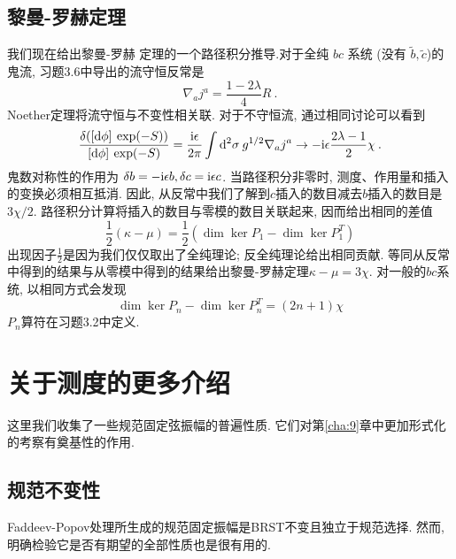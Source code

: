\subsection*{黎曼-罗赫定理}
我们现在给出黎曼-罗赫 定理的一个路径积分推导.对于全纯 $b c$ 系统 (没有 $\tilde{b}, \tilde{c}$)的鬼流, 习题3.6中导出的流守恒反常是
\begin{equation}
	\nabla_{a} j^{a}=\frac{1-2 \lambda}{4} R \:. \label{5.3.19}
\end{equation}
Noether定理将流守恒与不变性相关联. 对于不守恒流, 通过相同讨论可以看到
\begin{equation}
	\frac{\delta([\mathrm{d} \phi]\: \exp (-S))}{[\mathrm{d} \phi] \:\exp (-S)}=\frac{\mathrm{i} \epsilon}{2 \pi} \int \mathrm{d}^{2} \sigma \: g^{1 / 2} \nabla_{a} j^{a} \rightarrow-\mathrm{i} \epsilon \frac{2 \lambda-1}{2} \chi \:. \label{5.3.20}
\end{equation}
鬼数对称性的作用为 $\delta b=-\mathrm{i} \epsilon b, \delta c=\mathrm{i} \epsilon c $.  当路径积分非零时, 测度、作用量和插入的变换必须相互抵消. 
因此, 从反常中我们了解到$c$插入的数目减去$b$插入的数目是$3 \chi / 2 $.  路径积分计算将插入的数目与零模的数目关联起来, 因而给出相同的差值
\begin{equation}
	\frac{1}{2}(\kappa-\mu)=\frac{1}{2}(\operatorname{dim} \operatorname{ker} P_{1}-\operatorname{dim} \operatorname{ker} P_{1}^{T}) 
	\label{5.3.21}
\end{equation}
出现因子$\frac{1}{2}$是因为我们仅仅取出了全纯理论; 反全纯理论给出相同贡献. 等同从反常中得到的结果与从零模中得到的结果给出黎曼-罗赫定理$\kappa-\mu=3 \chi$. 
对一般的$b c$系统, 以相同方式会发现
\begin{equation}
	\operatorname{dim} \operatorname{ker} P_{n}-\operatorname{dim} \operatorname{ker} P_{n}^{T}=(2 n+1) \chi \label{5.3.22}
\end{equation}
$P_{n}$算符在习题3.2中定义.

\section{\texorpdfstring{关于测度的更多介绍}{5.4 More about the measure}} \label{sec:5.4}

这里我们收集了一些规范固定弦振幅的普遍性质. 它们对第\ref{cha:9}章中更加形式化的考察有奠基性的作用.

\subsection*{规范不变性}
Faddeev-Popov处理所生成的规范固定振幅是BRST不变且独立于规范选择. 然而, 明确检验它是否有期望的全部性质也是很有用的. 

